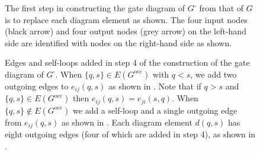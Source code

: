 \documentclass[../thesis-main/thesis-main]{subfiles}
\begin{document}
\begin{figure}
\centering
  
\caption{The first step in constructing the gate diagram of $G^{\square}$
from that of $G$ is to replace each diagram element as shown. The
four input nodes (black arrow) and four output nodes (grey arrow)
on the left-hand side are identified with nodes on the right-hand
side as shown.\label{fig:replace_gate_diagram}}
\end{figure}

\begin{figure}
\centering
{}
\hspace{.5cm}
\hspace{.5cm}
\caption{Edges and self-loops added in step 4 of the construction of the gate diagram of $G^{\square}$. When $\{q,s\}\in E(G^{\text{occ}})$ with $q<s$, we add two outgoing edges to $e_{ij}(q,s)$ as shown in . Note that if $q>s$ and $\{q,s\}\in E(G^{\text{occ}})$ then $e_{ij}(q,s)=e_{ji}(s,q)$. When $\{q,s\}\notin E(G^{\text{occ}})$ we add a self-loop and a single outgoing edge from $e_{ij}(q,s)$ as shown in . Each diagram element $d(q,s)$ has eight outgoing edges (four of which are added in step 4), as shown in .\label{fig:add_edges}}
\end{figure}
\end{document}
